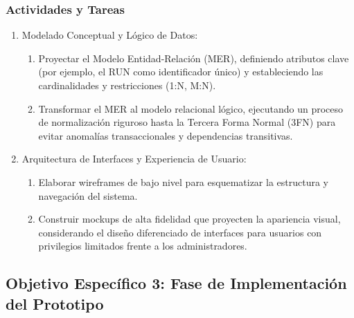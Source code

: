 \subsubsection{Actividades y Tareas}
\begin{enumerate}
	\item Modelado Conceptual y Lógico de Datos:
	\begin{enumerate}
		\item Proyectar el Modelo Entidad-Relación (MER), definiendo atributos clave (por ejemplo, el RUN como identificador único) y estableciendo las cardinalidades y restricciones (1:N, M:N).
		\item Transformar el MER al modelo relacional lógico, ejecutando un proceso de normalización riguroso hasta la Tercera Forma Normal (3FN) para evitar anomalías transaccionales y dependencias transitivas.
	\end{enumerate}
	\item Arquitectura de Interfaces y Experiencia de Usuario:
	\begin{enumerate}
		\item Elaborar wireframes de bajo nivel para esquematizar la estructura y navegación del sistema.
		\item Construir mockups de alta fidelidad que proyecten la apariencia visual, considerando el diseño diferenciado de interfaces para usuarios con privilegios limitados frente a los administradores.
	\end{enumerate}
\end{enumerate}

\subsection{Objetivo Específico 3: Fase de Implementación del Prototipo}
